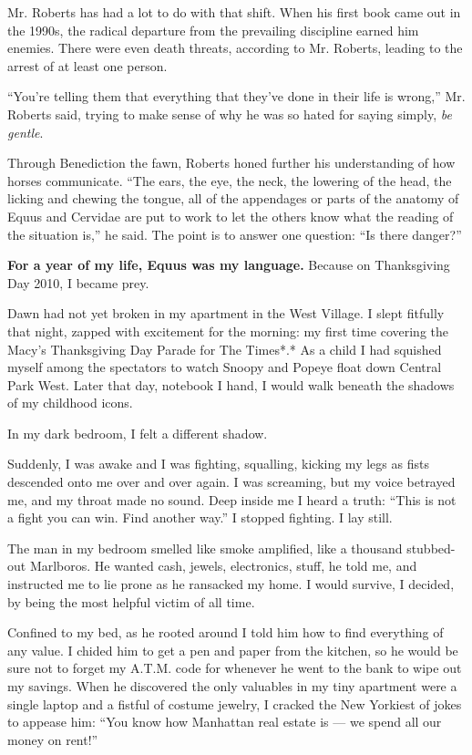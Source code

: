 Mr. Roberts has had a lot to do with that shift. When his first book
came out in the 1990s, the radical departure from the prevailing
discipline earned him enemies. There were even death threats, according
to Mr. Roberts, leading to the arrest of at least one person.

``You're telling them that everything that they've done in their life is
wrong,'' Mr. Roberts said, trying to make sense of why he was so hated
for saying simply, \emph{be gentle}.

Through Benediction the fawn, Roberts honed further his understanding of
how horses communicate. ``The ears, the eye, the neck, the lowering of
the head, the licking and chewing the tongue, all of the appendages or
parts of the anatomy of Equus and Cervidae are put to work to let the
others know what the reading of the situation is,'' he said. The point
is to answer one question: ``Is there danger?''

\textbf{For a year of my life, Equus was my language.} Because on
Thanksgiving Day 2010, I became prey.

Dawn had not yet broken in my apartment in the West Village. I slept
fitfully that night, zapped with excitement for the morning: my first
time covering the Macy's Thanksgiving Day Parade for The Times*.* As a
child I had squished myself among the spectators to watch Snoopy and
Popeye float down Central Park West. Later that day, notebook I hand, I
would walk beneath the shadows of my childhood icons.

In my dark bedroom, I felt a different shadow.

Suddenly, I was awake and I was fighting, squalling, kicking my legs as
fists descended onto me over and over again. I was screaming, but my
voice betrayed me, and my throat made no sound. Deep inside me I heard a
truth: ``This is not a fight you can win. Find another way.'' I stopped
fighting. I lay still.

The man in my bedroom smelled like smoke amplified, like a thousand
stubbed-out Marlboros. He wanted cash, jewels, electronics, stuff, he
told me, and instructed me to lie prone as he ransacked my home. I would
survive, I decided, by being the most helpful victim of all time.

Confined to my bed, as he rooted around I told him how to find
everything of any value. I chided him to get a pen and paper from the
kitchen, so he would be sure not to forget my A.T.M. code for whenever
he went to the bank to wipe out my savings. When he discovered the only
valuables in my tiny apartment were a single laptop and a fistful of
costume jewelry, I cracked the New Yorkiest of jokes to appease him:
``You know how Manhattan real estate is --- we spend all our money on
rent!''

